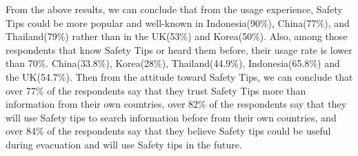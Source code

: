 From the above results, we can conclude that from the usage experience, Safety Tips could be more popular and well-known in Indonesia(90\%), China(77\%), and Thailand(79\%) rather than in the UK(53\%) and Korea(50\%). Also, among those respondents that know Safety Tips or heard them before, their usage rate is lower than 70\%. China(33.8\%), Korea(28\%), Thailand(44.9\%), Indonesia(65.8\%) and the UK(54.7\%). Then from the attitude toward Safety Tips, we can conclude that over 77\% of the respondents say that they trust Safety Tips more than information from their own countries, over 82\% of the respondents say that they will use Safety tips to search information before from their own countries, and over 84\% of the respondents say that they believe Safety tips could be useful during evacuation and will use Safety tips in the future.

